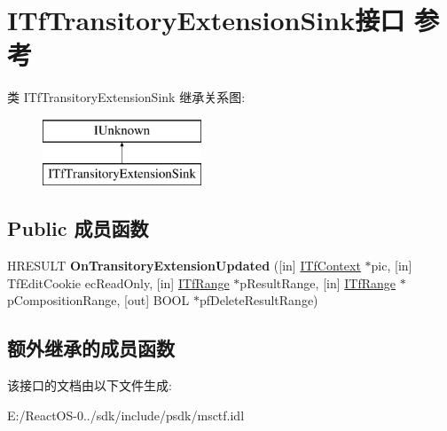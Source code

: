 \hypertarget{interface_i_tf_transitory_extension_sink}{}\section{I\+Tf\+Transitory\+Extension\+Sink接口 参考}
\label{interface_i_tf_transitory_extension_sink}
类 I\+Tf\+Transitory\+Extension\+Sink 继承关系图\+:\begin{figure}[H]
\begin{center}
\leavevmode
\includegraphics[height=2.000000cm]{interface_i_tf_transitory_extension_sink}
\end{center}
\end{figure}
\subsection*{Public 成员函数}
\begin{DoxyCompactItemize}
\item 
\mbox{\label{interface_i_tf_transitory_extension_sink_a708798079ff0a8e8519258f673642091}} 
H\+R\+E\+S\+U\+LT {\bfseries On\+Transitory\+Extension\+Updated} (\mbox{[}in\mbox{]} \hyperlink{interface_i_tf_context}{I\+Tf\+Context} $\ast$pic, \mbox{[}in\mbox{]} Tf\+Edit\+Cookie ec\+Read\+Only, \mbox{[}in\mbox{]} \hyperlink{interface_i_tf_range}{I\+Tf\+Range} $\ast$p\+Result\+Range, \mbox{[}in\mbox{]} \hyperlink{interface_i_tf_range}{I\+Tf\+Range} $\ast$p\+Composition\+Range, \mbox{[}out\mbox{]} B\+O\+OL $\ast$pf\+Delete\+Result\+Range)
\end{DoxyCompactItemize}
\subsection*{额外继承的成员函数}


该接口的文档由以下文件生成\+:\begin{DoxyCompactItemize}
\item 
E\+:/\+React\+O\+S-\/0../sdk/include/psdk/msctf.\+idl\end{DoxyCompactItemize}
